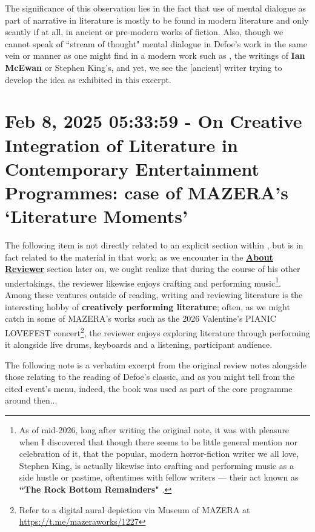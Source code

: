 \documentclass[a4paper]{article}
\begin{document}
The significance of this observation lies in the fact that use of mental dialogue as part of narrative in literature is mostly to be found in modern literature and only scantly if at all, in ancient or pre-modern works of fiction. Also, though we cannot speak of ``stream of thought" mental dialogue in Defoe's work in the same vein or manner as one might find in a modern work such as \cite{lutalo2025rock}, the writings of \textbf{Ian McEwan} or Stephen King's, and yet, we see the [ancient] writer trying to develop the idea as exhibited in this excerpt.






\section{Feb 8, 2025 05:33:59 - On Creative Integration of Literature in Contemporary Entertainment Programmes: case of MAZERA's `Literature Moments'}
\label{SEC12}

The following item is not directly related to an explicit section within \cite{Defoe2007}, but is in fact related to the material in that work; as we encounter in the \textbf{\hyperref[SECABOUT]{About Reviewer}} section later on, we ought realize that during the course of his other undertakings, the reviewer likewise enjoys crafting and performing music\footnote{As of mid-2026, long after writing the original note, it was with pleasure when I discovered that though there seems to be little general mention nor celebration of it, that the popular, modern horror-fiction writer we all love, Stephen King, is actually likewise into crafting and performing music as a side hustle or pastime, oftentimes with fellow writers --- their act known as \textbf{``The Rock Bottom Remainders"} \cite{King2000}.}. Among these ventures outside of reading, writing and reviewing literature is the interesting hobby of \textbf{creatively performing literature}; often, as we might catch in some of MAZERA's works such as the 2026 Valentine's PIANIC LOVEFEST concert\footnote{Refer to a digital aural depiction via Museum of MAZERA at \url{https://t.me/mazeraworks/1227}}, the reviewer enjoys exploring literature through performing it alongside live drums, keyboards and a listening, participant audience.

The following note is a verbatim excerpt from the original review notes alongside those relating to the reading of Defoe's classic, and as you might tell from the cited event's menu, indeed, the book was used as part of the core programme around then...
\end{document}
